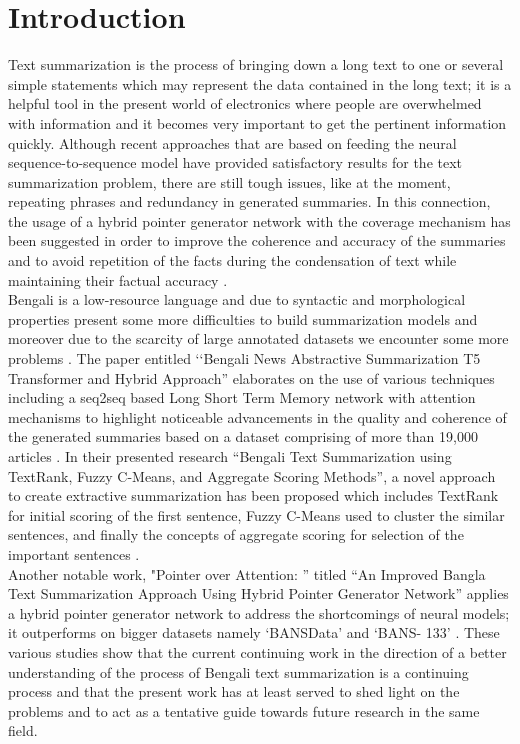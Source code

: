\documentclass[12pt]{report}
\begin{document}
\section*{Introduction}
Text summarization is the process of bringing down a long text to one or several simple statements which may represent the data contained in the long text; it is a helpful tool in the present world of electronics where people are overwhelmed with information and it becomes very important to get the pertinent information quickly. Although recent approaches that are based on feeding the neural sequence-to-sequence model have provided satisfactory results for the text summarization problem, there are still tough issues, like at the moment, repeating phrases and redundancy in generated summaries. In this connection, the usage of a hybrid pointer generator network with the coverage mechanism has been suggested in order to improve the coherence and accuracy of the summaries and to avoid repetition of the facts during the condensation of text while maintaining their factual accuracy \cite{dhar2021pointer}. \\
Bengali is a low-resource language and due to syntactic and morphological properties present some more difficulties to build summarization models and moreover due to the scarcity of large annotated datasets we encounter some more problems \cite{rahman2019bengali}. The paper entitled ‘‘Bengali News Abstractive Summarization T5 Transformer and Hybrid Approach” elaborates on the use of various techniques including a seq2seq based Long Short Term Memory network with attention mechanisms to highlight noticeable advancements in the quality and coherence of the generated summaries based on a dataset comprising of more than 19,000 articles \cite{hasib2023bengali}. In their presented research “Bengali Text Summarization using TextRank, Fuzzy C-Means, and Aggregate Scoring Methods”, a novel approach to create extractive summarization has been proposed which includes TextRank for initial scoring of the first sentence, Fuzzy C-Means used to cluster the similar sentences, and finally the concepts of aggregate scoring for selection of the important sentences \cite{rahman2019bengali}.\\
Another notable work, "Pointer over Attention: ” titled “An Improved Bangla Text Summarization Approach Using Hybrid Pointer Generator Network” applies a hybrid pointer generator network to address the shortcomings of neural models; it outperforms on bigger datasets namely ‘BANSData’ and ‘BANS- 133’ \cite{dhar2021pointer}. These various studies show that the current continuing work in the direction of a better understanding of the process of Bengali text summarization is a continuing process and that the present work has at least served to shed light on the problems and to act as a tentative guide towards future research in the same field.
\end{document}
